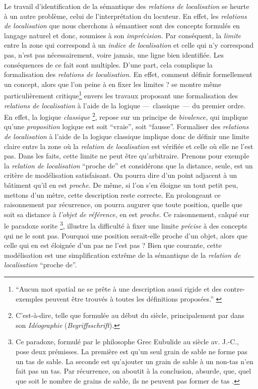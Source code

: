 Le travail d'identification de la sémantique des \emph{relations de
  localisation} se heurte à un autre problème, celui de
l'interprétation du locuteur. En effet, les \emph{relations de
  localisation} que nous cherchons à sémantiser sont des concepts
formulés en langage naturel et donc, soumises à son
\emph{imprécision.}  Par conséquent, la \emph{limite} entre la zone
qui correspond à un \emph{indice de localisation} et celle qui n'y
correspond pas, n'est pas nécessairement, voire jamais, une ligne bien
identifiée. Les conséquences de ce fait sont multiples. D'une part,
cela complique la formalisation des \emph{relations de localisation.}
En effet, comment définir formellement un concept, alors que l'on
peine à en fixer les limites ?  \textcite{Vandeloise1986} se montre
même particulièrement critique\footnote{\enquote{Aucun mot spatial ne
    se prête à une description aussi rigide et des contre-exemples
    peuvent être trouvés à toutes les définitions proposées.}
  \autocite[p. 18]{Vandeloise1986}} envers les travaux proposant une
formalisation des \emph{relations de localisation} à l'aide de la
logique ---~classique~--- du premier ordre. En effet, la logique
\emph{classique} \footnote{C'est-à-dire, telle que formulée au début
  du  siècle, principalement par  dans son
  \emph{Idéographie} (\emph{Begriffsschrift}).}, repose sur un
principe de \emph{bivalence,} qui implique qu'une \emph{proposition}
logique est soit \enquote{vraie}, soit \enquote{fausse}. Formaliser
des \emph{relations de localisation} à l'aide de la logique classique
implique donc de définir une limite claire entre la zone où la
\emph{relation de localisation} est vérifiée et celle où elle ne l'est
pas. Dans les faits, cette limite ne peut être qu'arbitraire. Prenons
pour exemple la \emph{relation de localisation} \enquote{proche de} et
considérons que la distance, seule, est un critère de modélisation
satisfaisant. On pourra dire d'un point adjacent à un bâtiment qu'il
en est \emph{proche.} De même, si l'on s'en éloigne un tout petit peu,
mettons d'un mètre, cette description reste correcte. En prolongeant
ce raisonnement par récurrence, on pourra augurer que toute position,
quelle que soit sa distance à \emph{l'objet de référence,} en est
\emph{proche}. Ce raisonnement, calqué sur le paradoxe sorite
\footnote{Ce paradoxe, formulé par le philosophe Grec Eubulide au
   siècle av. J.-C., pose deux prémisses. La première
  est qu'un seul grain de sable ne forme pas un tas de sable. La
  seconde est qu'ajouter un grain de sable à un non-tas n'en fait pas
  un tas. Par récurrence, on aboutit à la conclusion, absurde, que,
  quel que soit le nombre de grains de sable, ils ne peuvent pas
  former de tas \autocite{Sorensen2018,Hyde2018}.}, illustre la
difficulté à fixer une limite \emph{précise} à des concepts qui ne le
sont pas. Pourquoi une position serait-elle proche d'un objet, alors
que celle qui en est éloignée d'un pas ne l'est pas ? Bien que
courante, cette modélisation est une simplification extrême de la
sémantique de la \emph{relation de localisation} \enquote{proche de}.


